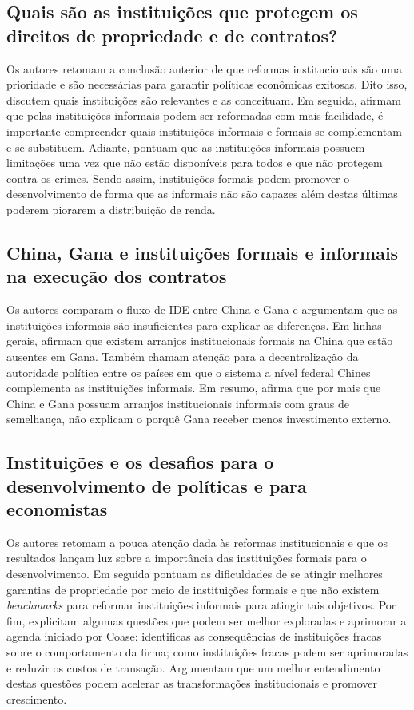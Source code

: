 \subsection*{Quais são as instituições que protegem os direitos de propriedade e de contratos?}

Os autores retomam a conclusão anterior de que reformas institucionais são uma prioridade e são necessárias para garantir políticas econômicas exitosas. Dito isso, discutem quais instituições são relevantes e as conceituam. Em seguida, afirmam que pelas instituições informais podem ser reformadas com mais facilidade, é importante compreender quais instituições informais e formais se complementam e se substituem. Adiante, pontuam que as instituições informais possuem limitações uma vez que não estão disponíveis para todos e que não protegem contra os crimes. Sendo assim, instituições formais podem promover o desenvolvimento de forma que as informais não são capazes além destas últimas poderem piorarem a distribuição de renda.

\subsection*{China, Gana e instituições formais e informais na execução dos contratos}

Os autores comparam o fluxo de IDE entre China e Gana e argumentam que as instituições informais são insuficientes para explicar as diferenças. Em linhas gerais, afirmam que existem arranjos institucionais formais na China que estão ausentes em Gana. Também chamam atenção para a decentralização da autoridade política entre os países em que o sistema a nível federal Chines complementa as instituições informais. Em resumo, afirma que por mais que China e Gana possuam arranjos institucionais informais com graus de semelhança, não explicam o porquê Gana receber menos investimento externo.

\subsection{Instituições e os desafios para o desenvolvimento de políticas e para economistas}

Os autores retomam a pouca atenção dada às reformas institucionais e que os resultados lançam luz sobre a importância das instituições formais para o desenvolvimento. Em seguida pontuam as dificuldades de se atingir melhores garantias de propriedade por meio de instituições formais e que não existem \textit{benchmarks} para reformar instituições informais para atingir tais objetivos. Por fim, explicitam algumas questões que podem ser melhor exploradas e aprimorar a agenda iniciado por Coase: identificas as consequências de instituições fracas sobre o comportamento da firma; como instituições fracas podem ser aprimoradas e reduzir os custos de transação. Argumentam que um melhor entendimento destas questões podem acelerar as transformações institucionais e promover crescimento.